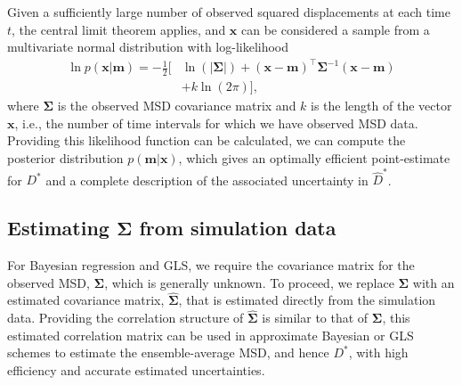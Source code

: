 \documentclass[reprint,superscriptaddress,nobibnotes,amsmath,amssymb,aps,prx,hidelinks,linenumbers]{revtex4-2}
\newcommand{\oMSD}{\ensuremath{\bm{x}}}
\newcommand{\model}{\bm{m}}
\newcommand{\prob}[1]{\ensuremath{p(#1)}}
\newcommand{\Dest}{\ensuremath{\widehat{D}^*}}
\newcommand{\D}{\ensuremath{D^*}}
\begin{document}
Given a sufficiently large number of observed squared displacements at each time $t$, the central limit theorem applies, and $\oMSD$ can be considered a sample from a multivariate normal distribution with log-likelihood
%
\begin{equation}
    \begin{aligned}{}
      \ln \prob{\oMSD|\model} = -\frac{1}{2}\big[ & \ln(\left|\mathbf{\Sigma}\right|) + {(\oMSD - \model)}^{\!\top}\mathbf{\Sigma}^{-1}(\oMSD - \model) \\ 
      & + k \ln(2\pi)\big],
    \end{aligned}
    \label{equ:loglike}
\end{equation}
%
where $\mathbf{\Sigma}$ is the observed MSD covariance matrix and $k$ is the length of the vector $\oMSD$, i.e., the number of time intervals for which we have observed MSD data.
Providing this likelihood function can be calculated, we can compute the posterior distribution $\prob{\model | \oMSD}$, which gives an optimally efficient point-estimate for $\D$ and a complete description of the associated uncertainty in $\Dest$.

\subsection{Estimating $\mathbf{\Sigma}$ from simulation data}

For Bayesian regression and GLS, we require the covariance matrix for the observed MSD, $\mathbf{\Sigma}$, which is generally unknown.
To proceed, we replace $\mathbf{\Sigma}$ with an estimated covariance matrix, $\widehat{\mathbf{\Sigma}}$, that is estimated directly from the simulation data.
Providing the correlation structure of $\widehat{\mathbf{\Sigma}}$ is similar to that of $\mathbf{\Sigma}$, this estimated correlation matrix can be used in approximate Bayesian or GLS schemes to estimate the ensemble-average MSD, and hence $\D$, with high efficiency and accurate estimated uncertainties.
\end{document}
